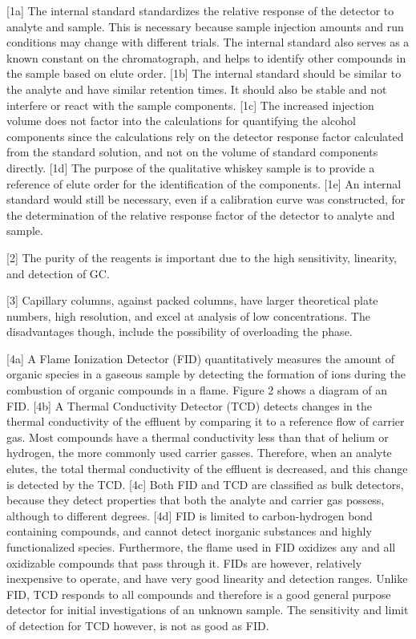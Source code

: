 \documentclass{article}
\begin{document}
\begin{multicols}{2}
{[1a] The internal standard standardizes the relative response of the detector to
analyte and sample. This is necessary because sample injection amounts and run
conditions may change with different trials. The internal standard also serves
as a known constant on the chromatograph, and helps to identify other compounds in the
sample based on elute order. 
[1b] The internal standard should be similar to the
analyte and have similar retention times. It should also be stable and not
interfere or react with the sample components. 
[1c] The increased injection volume does not factor into the calculations for
quantifying the alcohol components since the calculations rely on the detector
response factor calculated from the standard solution, and not on the volume of
standard components directly. 
[1d] The purpose of the qualitative whiskey sample is to provide a
reference of elute order for the identification of the components. 
[1e] An internal standard would still be necessary, even if a calibration curve was
constructed, for the determination of the relative response factor of the
detector to analyte and sample.

[2] The purity of the reagents is important due to the high sensitivity,
linearity, and detection of GC.

[3] Capillary columns, against packed columns, have larger theoretical plate
numbers, high resolution, and excel at analysis of low concentrations. The
disadvantages though, include the possibility of overloading the phase.

[4a] A Flame Ionization Detector (FID) quantitatively measures the amount of organic species
in a gaseous sample by detecting the formation of ions during the combustion of
organic compounds in a flame. Figure 2 shows a diagram of an FID.
[4b] A Thermal Conductivity Detector (TCD) detects changes in the thermal
conductivity of the effluent by comparing it to a reference flow of carrier gas.
Most compounds have a thermal conductivity less than that of helium or hydrogen,
the more commonly used carrier gasses. Therefore, when an analyte elutes, the
total thermal conductivity of the effluent is decreased, and this change is
detected by the TCD.
[4c] Both FID and TCD are classified as bulk detectors, because they detect
properties that both the analyte and carrier gas possess, although to different
degrees.
[4d] FID is limited to carbon-hydrogen bond containing compounds, and cannot
detect inorganic substances and highly functionalized species. Furthermore, the
flame used in FID oxidizes any and all oxidizable compounds that pass through
it. FIDs are however, relatively inexpensive to operate, and have very good
linearity and detection ranges. \cite{Harris}
Unlike FID, TCD responds to all compounds and therefore is a good general
purpose detector for initial investigations of an unknown sample. The
sensitivity and limit of detection for TCD however, is not as good as FID.

}
\end{multicols}
\end{document}

